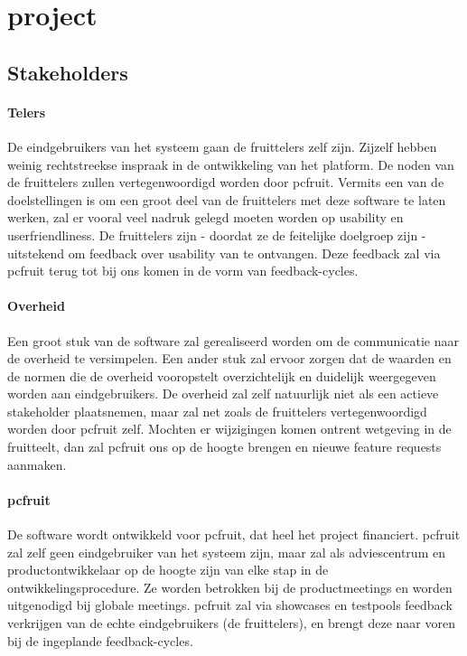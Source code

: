 \section {project}


\subsection {Stakeholders}

\paragraph {Telers} De eindgebruikers van het systeem gaan de fruittelers zelf zijn. Zijzelf hebben weinig rechtstreekse inspraak in de ontwikkeling van het platform. De noden van de fruittelers zullen vertegenwoordigd worden door pcfruit. Vermits een van de doelstellingen is om een groot deel van de fruittelers met deze software te laten werken, zal er vooral veel nadruk gelegd moeten worden op usability en userfriendliness. De fruittelers zijn - doordat ze de feitelijke doelgroep zijn - uitstekend om feedback over usability van te ontvangen. Deze feedback zal via pcfruit terug tot bij ons komen in de vorm van feedback-cycles.

\paragraph {Overheid} Een groot stuk van de software zal gerealiseerd worden om de communicatie naar de overheid te versimpelen. Een ander stuk zal ervoor zorgen dat de waarden en de normen die de overheid vooropstelt overzichtelijk en duidelijk weergegeven worden aan eindgebruikers. De overheid zal zelf natuurlijk niet als een actieve stakeholder plaatsnemen, maar zal net zoals de fruittelers vertegenwoordigd worden door pcfruit zelf. Mochten er wijzigingen komen ontrent wetgeving in de fruitteelt, dan zal pcfruit ons op de hoogte brengen en nieuwe feature requests aanmaken.

\paragraph {pcfruit} De software wordt ontwikkeld voor pcfruit, dat heel het project financiert. pcfruit zal zelf geen eindgebruiker van het systeem zijn, maar zal als adviescentrum en productontwikkelaar op de hoogte zijn van elke stap in de ontwikkelingsprocedure. Ze worden betrokken bij de productmeetings en worden uitgenodigd bij globale meetings. pcfruit zal via showcases en testpools feedback verkrijgen van de echte eindgebruikers (de fruittelers), en brengt deze naar voren bij de ingeplande feedback-cycles.

